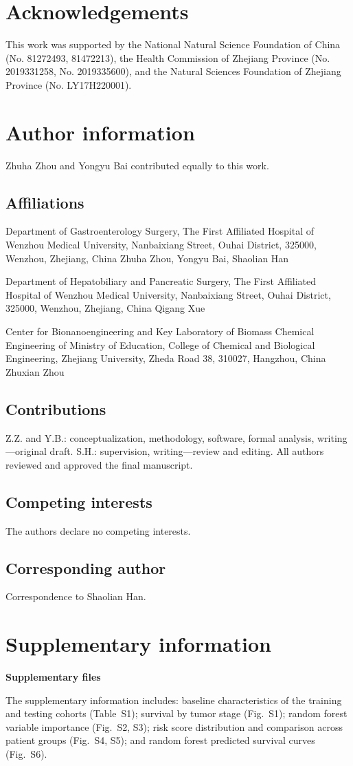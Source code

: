 \documentclass[fleqn,10pt]{wlscirep}
\begin{document}
\section*{Acknowledgements}
This work was supported by the National Natural Science Foundation of China (No. 81272493, 81472213), the Health Commission of Zhejiang Province (No. 2019331258, No. 2019335600), and the Natural Sciences Foundation of Zhejiang Province (No. LY17H220001).

\section*{Author information}
Zhuha Zhou and Yongyu Bai contributed equally to this work.

\subsection*{Affiliations}
Department of Gastroenterology Surgery, The First Affiliated Hospital of Wenzhou Medical University, Nanbaixiang Street, Ouhai District, 325000, Wenzhou, Zhejiang, China \hfill Zhuha Zhou, Yongyu Bai, Shaolian Han

\noindent Department of Hepatobiliary and Pancreatic Surgery, The First Affiliated Hospital of Wenzhou Medical University, Nanbaixiang Street, Ouhai District, 325000, Wenzhou, Zhejiang, China \hfill Qigang Xue

\noindent Center for Bionanoengineering and Key Laboratory of Biomass Chemical Engineering of Ministry of Education, College of Chemical and Biological Engineering, Zhejiang University, Zheda Road 38, 310027, Hangzhou, China \hfill Zhuxian Zhou

\subsection*{Contributions}
Z.Z. and Y.B.: conceptualization, methodology, software, formal analysis, writing---original draft. S.H.: supervision, writing---review and editing. All authors reviewed and approved the final manuscript.

\subsection*{Competing interests}
The authors declare no competing interests.

\subsection*{Corresponding author}
Correspondence to Shaolian Han.

\section*{Supplementary information}

\textbf{Supplementary files}

The supplementary information includes: baseline characteristics of the training and testing cohorts (Table~S1); survival by tumor stage (Fig.~S1); random forest variable importance (Fig.~S2, S3); risk score distribution and comparison across patient groups (Fig.~S4, S5); and random forest predicted survival curves (Fig.~S6).
\end{document}
